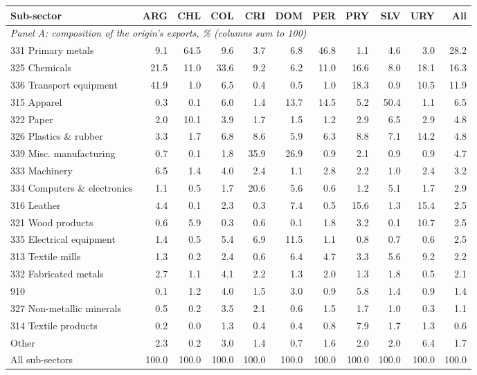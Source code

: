 \begin{tabular}{lrrrrrrrrrr}
\toprule
Sub-sector & ARG & CHL & COL & CRI & DOM & PER & PRY & SLV & URY & All \\
\midrule
\multicolumn{11}{l}{\textit{Panel A: composition of the origin's exports, \% (columns sum to 100)}} \\
331 Primary metals & 9.1 & 64.5 & 9.6 & 3.7 & 6.8 & 46.8 & 1.1 & 4.6 & 3.0 & 28.2 \\
325 Chemicals & 21.5 & 11.0 & 33.6 & 9.2 & 6.2 & 11.0 & 16.6 & 8.0 & 18.1 & 16.3 \\
336 Transport equipment & 41.9 & 1.0 & 6.5 & 0.4 & 0.5 & 1.0 & 18.3 & 0.9 & 10.5 & 11.9 \\
315 Apparel & 0.3 & 0.1 & 6.0 & 1.4 & 13.7 & 14.5 & 5.2 & 50.4 & 1.1 & 6.5 \\
322 Paper & 2.0 & 10.1 & 3.9 & 1.7 & 1.5 & 1.2 & 2.9 & 6.5 & 2.9 & 4.8 \\
326 Plastics \& rubber & 3.3 & 1.7 & 6.8 & 8.6 & 5.9 & 6.3 & 8.8 & 7.1 & 14.2 & 4.8 \\
339 Misc. manufacturing & 0.7 & 0.1 & 1.8 & 35.9 & 26.9 & 0.9 & 2.1 & 0.9 & 0.9 & 4.7 \\
333 Machinery & 6.5 & 1.4 & 4.0 & 2.4 & 1.1 & 2.8 & 2.2 & 1.0 & 2.4 & 3.2 \\
334 Computers \& electronics & 1.1 & 0.5 & 1.7 & 20.6 & 5.6 & 0.6 & 1.2 & 5.1 & 1.7 & 2.9 \\
316 Leather & 4.4 & 0.1 & 2.3 & 0.3 & 7.4 & 0.5 & 15.6 & 1.3 & 15.4 & 2.5 \\
321 Wood products & 0.6 & 5.9 & 0.3 & 0.6 & 0.1 & 1.8 & 3.2 & 0.1 & 10.7 & 2.5 \\
335 Electrical equipment & 1.4 & 0.5 & 5.4 & 6.9 & 11.5 & 1.1 & 0.8 & 0.7 & 0.6 & 2.5 \\
313 Textile mills & 1.3 & 0.2 & 2.4 & 0.6 & 6.4 & 4.7 & 3.3 & 5.6 & 9.2 & 2.2 \\
332 Fabricated metals & 2.7 & 1.1 & 4.1 & 2.2 & 1.3 & 2.0 & 1.3 & 1.8 & 0.5 & 2.1 \\
910 & 0.1 & 1.2 & 4.0 & 1.5 & 3.0 & 0.9 & 5.8 & 1.4 & 0.9 & 1.4 \\
327 Non-metallic minerals & 0.5 & 0.2 & 3.5 & 2.1 & 0.6 & 1.5 & 1.7 & 1.0 & 0.3 & 1.1 \\
314 Textile products & 0.2 & 0.0 & 1.3 & 0.4 & 0.4 & 0.8 & 7.9 & 1.7 & 1.3 & 0.6 \\
Other & 2.3 & 0.2 & 3.0 & 1.4 & 0.7 & 1.6 & 2.0 & 2.0 & 6.4 & 1.7 \\
All sub-sectors & 100.0 & 100.0 & 100.0 & 100.0 & 100.0 & 100.0 & 100.0 & 100.0 & 100.0 & 100.0 \\

\end{tabular}
